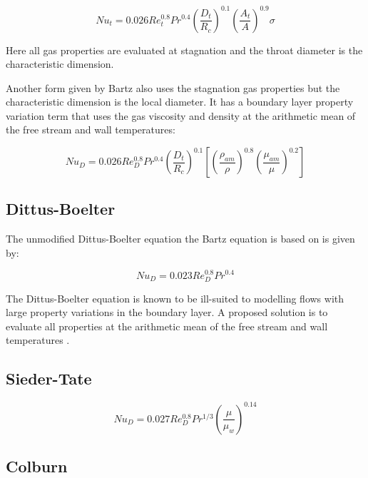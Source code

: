 \documentclass[11pt]{article}
\begin{document}
\begin{equation}
  Nu_{t} = 0.026 Re_{t}^{0.8} Pr^{0.4} \left( \frac{D_t}{R_c} \right)^{0.1} \left( \frac{A_t}{A} \right)^{0.9} \sigma
\end{equation}

Here all gas properties are evaluated at stagnation and the throat diameter is the characteristic dimension.

Another form given by Bartz also uses the stagnation gas properties but the characteristic dimension is the local diameter. It has a boundary layer property variation term that uses the gas viscosity and density at the arithmetic mean of the free stream and wall temperatures:

\begin{equation}
  Nu_{D} = 0.026 Re_{D}^{0.8} Pr^{0.4} \left( \frac{D_t}{R_c} \right)^{0.1} \left[ \left( \frac{\rho_{am}}{\rho} \right)^{0.8} \left(\frac{\mu_{am}}{\mu} \right)^{0.2}\right]
\end{equation}


\subsection{Dittus-Boelter}

The unmodified Dittus-Boelter equation the Bartz equation is based on is given by:


\begin{equation}
  Nu_{D} = 0.023 Re_{D}^{0.8} Pr^{0.4}
\end{equation}

The Dittus-Boelter equation is known to be ill-suited to modelling flows with large property variations in the boundary layer. A proposed solution is to evaluate all properties at the arithmetic mean of the free stream and wall temperatures \cite{}.

\subsection{Sieder-Tate}

\begin{equation}
  Nu_{D} = 0.027 Re_{D}^{0.8} Pr^{1/3} \left( \frac{\mu}{\mu_w} \right)^{0.14}
\end{equation}

\subsection{Colburn}
\end{document}
